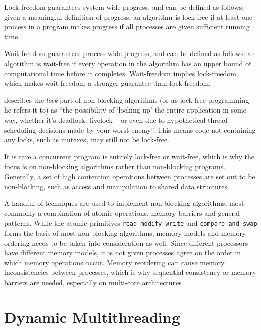 Lock\hyp{}freedom guarantees system\hyp{}wide progress, and can be defined as follows: given a meaningful definition of progress, an algorithm is lock\hyp{}free if at least one process in a program makes progress if all processes are given sufficient running time. 

Wait\hyp{}freedom guarantees process\hyp{}wide progress, and can be defined as follows: an algorithm is wait\hyp{}free if every operation in the algorithm has an upper bound of computational time before it completes. Wait\hyp{}freedom implies lock\hyp{}freedom, which makes wait\hyp{}freedom a stronger guarantee than lock\hyp{}freedom.

\citet{preshing2012lockfree} describes the \textit{lock} part of non\hyp{}blocking algorithms (or as lock\hyp{}free programming he refers it to) as ``the possibility of `locking up' the entire application in some way, wheth\-er it's deadlock, livelock -- or even due to hypothetical thread scheduling decisions made by your worst enemy''. This means code not containing any locks, such as mutexes, may still not be lock\hyp{}free. 

It is rare a concurrent program is entirely lock\hyp{}free or wait\hyp{}free, which is why the focus is on non\hyp{}blocking algorithms rather than non\hyp{}blocking programs. Generally, a set of high contention operations between processes are set out to be non\hyp{}blocking, such as access and manipulation to shared data structures.

A handful of techniques are used to implement non\hyp{}blocking algorithms, most commonly a combination of atomic operations, memory barriers and general patterns. While the atomic primitives \texttt{read\hyp{}modify\hyp{}write} and \texttt{compare\hyp{}and\hyp{}swap} forms the basis of most non\hyp{}blocking algorithms, memory models and memory ordering needs to be taken into consideration as well. Since different processors have different memory models, it is not given processes agree on the order in which memory operations occur. Memory reordering can cause memory inconsistencies between processes, which is why sequential consistency or memory barriers are needed, especially on multi\hyp{}core architectures \citep{preshing2012weakstrong,preshing2012barriers,preshing2012lockfree,preshing2012acquire}.


\section{Dynamic Multithreading}
\label{sec:dynamic_multithreading}


